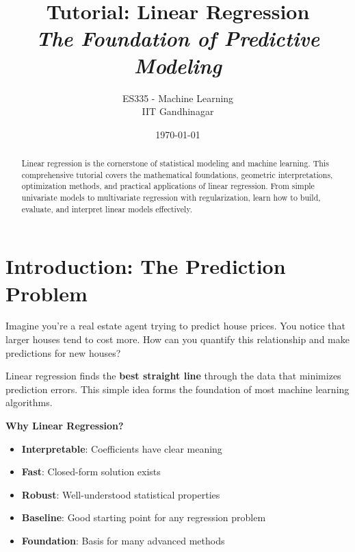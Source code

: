 \documentclass{article}
\title{\textbf{Tutorial: Linear Regression} \\ \textit{The Foundation of Predictive Modeling}}
\author{ES335 - Machine Learning \\ IIT Gandhinagar}
\date{\today}
\begin{document}
\maketitle

\begin{abstract}
Linear regression is the cornerstone of statistical modeling and machine learning. This comprehensive tutorial covers the mathematical foundations, geometric interpretations, optimization methods, and practical applications of linear regression. From simple univariate models to multivariate regression with regularization, learn how to build, evaluate, and interpret linear models effectively.
\end{abstract}

\tableofcontents
\newpage

\section{Introduction: The Prediction Problem}

Imagine you're a real estate agent trying to predict house prices. You notice that larger houses tend to cost more. How can you quantify this relationship and make predictions for new houses?

\begin{center}
\end{center}

Linear regression finds the \textbf{best straight line} through the data that minimizes prediction errors. This simple idea forms the foundation of most machine learning algorithms.

\textbf{Why Linear Regression?}
\begin{itemize}
    \item \textbf{Interpretable}: Coefficients have clear meaning
    \item \textbf{Fast}: Closed-form solution exists
    \item \textbf{Robust}: Well-understood statistical properties
    \item \textbf{Baseline}: Good starting point for any regression problem
    \item \textbf{Foundation}: Basis for many advanced methods
\end{itemize}
\end{document}
